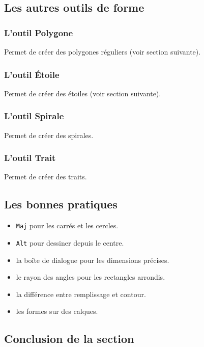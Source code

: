 \subsection{Les autres outils de forme}

\subsubsection{L'outil Polygone}

Permet de créer des polygones réguliers (voir section suivante).

\subsubsection{L'outil Étoile}

Permet de créer des étoiles (voir section suivante).

\subsubsection{L'outil Spirale}

Permet de créer des spirales.

\subsubsection{L'outil Trait}

Permet de créer des traits.

\subsection{Les bonnes pratiques}

\begin{itemize}
    \item {} \texttt{Maj} pour les carrés et les cercles.
    \item {} \texttt{Alt} pour dessiner depuis le centre.
    \item {} la boîte de dialogue pour les dimensions précises.
    \item {} le rayon des angles pour les rectangles arrondis.
    \item {} la différence entre remplissage et contour.
    \item {} les formes sur des calques.
\end{itemize}

\subsection*{Conclusion de la section}

